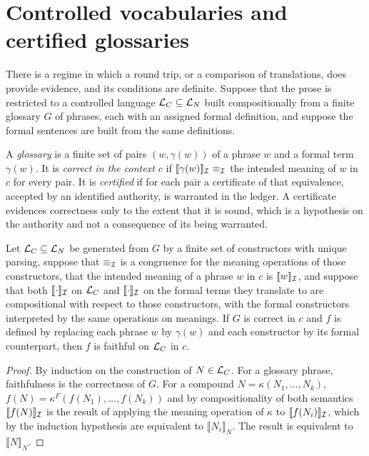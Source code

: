 \section{Controlled vocabularies and certified glossaries}

There is a regime in which a round trip, or a comparison of translations, does provide evidence, and its conditions are definite. Suppose that the prose is restricted to a controlled language $\mathcal{L}_C\subseteq \mathcal{L}_N$ built compositionally from a finite glossary $G$ of phrases, each with an assigned formal definition, and suppose the formal sentences are built from the same definitions.

\begin{definition}
\label{def:glossary}
A \emph{glossary} is a finite set of pairs $(w,\gamma(w))$ of a phrase $w$ and a formal term $\gamma(w)$. It is \emph{correct in the context $c$} if $\llbracket\gamma(w)\rrbracket_{\mathcal{I}}\equiv_{\mathcal{I}}$ the intended meaning of $w$ in $c$ for every pair. It is \emph{certified} if for each pair a certificate of that equivalence, accepted by an identified authority, is warranted in the ledger. A certificate evidences correctness only to the extent that it is sound, which is a hypothesis on the authority and not a consequence of its being warranted.
\end{definition}

\begin{proposition}
\label{prop:glossary}
Let $\mathcal{L}_C\subseteq\mathcal{L}_N$ be generated from $G$ by a finite set of constructors with unique parsing, suppose that $\equiv_{\mathcal{I}}$ is a congruence for the meaning operations of those constructors, that the intended meaning of a phrase $w$ in $c$ is $\llbracket w\rrbracket_{\mathcal{I}}$, and suppose that both $\llbracket\cdot\rrbracket_{\mathcal{I}}$ on $\mathcal{L}_C$ and $\llbracket\cdot\rrbracket_{\mathcal{I}}$ on the formal terms they translate to are compositional with respect to those constructors, with the formal constructors interpreted by the same operations on meanings. If $G$ is correct in $c$ and $f$ is defined by replacing each phrase $w$ by $\gamma(w)$ and each constructor by its formal counterpart, then $f$ is faithful on $\mathcal{L}_C$ in $c$.
\end{proposition}

\begin{proof}
By induction on the construction of $N\in\mathcal{L}_C$. For a glossary phrase, faithfulness is the correctness of $G$. For a compound $N=\kappa(N_1,\dots,N_k)$, $f(N)=\kappa^{F}(f(N_1),\dots,f(N_k))$ and by compositionality of both semantics $\llbracket f(N)\rrbracket_{\mathcal{I}}$ is the result of applying the meaning operation of $\kappa$ to $\llbracket f(N_i)\rrbracket_{\mathcal{I}}$, which by the induction hypothesis are equivalent to $\llbracket N_i\rrbracket_N$. The result is equivalent to $\llbracket N\rrbracket_N$.
\end{proof}


